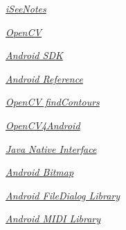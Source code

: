 \documentclass[pdftex,11pt,a4paper]{article}
\begin{document}


\renewcommand{\abstractname}{Executive Summary}

\tableofcontents
\listoffigures
\listoftables







\begin{thebibliography}{9}

    \emph{\href{http://www.iseenotes.com}{iSeeNotes}}

    \emph{\href{http://opencv.org/}{OpenCV}}

    \emph{\href{http://developer.android.com/sdk/index.html}{Android SDK}}

    \emph{\href{http://developer.android.com/reference/android/app/Activity.html}{Android Reference}}

    \emph{\href{http://docs.opencv.org/modules/imgproc/doc/structural_analysis_and_shape_descriptors.html}{OpenCV findContours}}

    \emph{\href{http://opencv.org/android}{OpenCV4Android}}

    \emph{\href{http://docs.oracle.com/javase/6/docs/technotes/guides/jni/spec/jniTOC.html}{Java Native Interface}}

    \emph{\href{http://developer.android.com/reference/android/graphics/Bitmap.html}{Android Bitmap}}

    \emph{\href{https://code.google.com/p/android-file-dialog/}{Android FileDialog Library}}

    \emph{\href{https://code.google.com/p/android-midi-lib/}{Android MIDI Library}}

\end{thebibliography}
\end{document}
